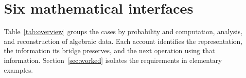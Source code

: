 \section{Six mathematical interfaces}
\label{sec:cases}

Table~\ref{tab:overview} groups the cases by probability and computation,
analysis, and reconstruction of algebraic data. Each account identifies
the representation, the information its bridge preserves, and the next
operation using that information. Section~\ref{sec:worked} isolates the
requirements in elementary examples.





